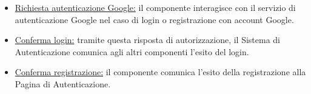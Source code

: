 \documentclass[11pt, a4paper]{article}
\theoremstyle{definition} %
\begin{document}
\begin{description}
\begin{itemize}
        \item \underline{Richiesta autenticazione Google:} il componente
        interagisce con il servizio di autenticazione Google nel caso
        di login o registrazione con account Google.

        \item \underline{Conferma login:} tramite questa risposta di autorizzazione,
        il Sistema di Autenticazione comunica agli altri componenti l'esito
        del login.

        \item \underline{Conferma registrazione:} il componente comunica
        l'esito della registrazione alla Pagina di Autenticazione.
    \end{itemize}
\end{description}


\newpage
\end{document}
